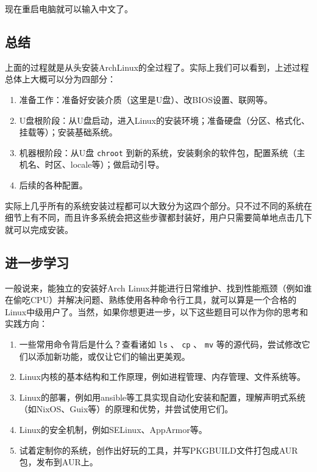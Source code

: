 现在重启电脑就可以输入中文了。

\subsection{总结}

上面的过程就是从头安装ArchLinux的全过程了。实际上我们可以看到，上述过程总体上大概可以分为四部分：
\begin{enumerate}
  \item 准备工作：准备好安装介质（这里是U盘）、改BIOS设置、联网等。
  \item U盘根阶段：从U盘启动，进入Linux的安装环境；准备硬盘（分区、格式化、挂载等）；安装基础系统。
  \item 机器根阶段：从U盘 \texttt{chroot} 到新的系统，安装剩余的软件包，配置系统（主机名、时区、locale等）；做启动引导。
  \item 后续的各种配置。
\end{enumerate}
实际上几乎所有的系统安装过程都可以大致分为这四个部分。只不过不同的系统在细节上有不同，而且许多系统会把这些步骤都封装好，用户只需要简单地点击几下就可以完成安装。

\subsection{进一步学习}

一般说来，能独立的安装好Arch Linux并能进行日常维护、找到性能瓶颈（例如谁在偷吃CPU）并解决问题、熟练使用各种命令行工具，就可以算是一个合格的Linux中级用户了。当然，如果你想更进一步，以下这些题目可以作为你的思考和实践方向：
\begin{enumerate}
  \item 一些常用命令背后是什么？查看诸如 \texttt{ls} 、 \texttt{cp} 、 \texttt{mv} 等的源代码，尝试修改它们以添加新功能，或仅让它们的输出更美观。
  \item Linux内核的基本结构和工作原理，例如进程管理、内存管理、文件系统等。
  \item Linux的部署，例如用ansible等工具实现自动化安装和配置，理解声明式系统（如NixOS、Guix等）的原理和优势，并尝试使用它们。
  \item Linux的安全机制，例如SELinux、AppArmor等。
  \item 试着定制你的系统，创作出好玩的工具，并写PKGBUILD文件打包成AUR包，发布到AUR上。
\end{enumerate}
